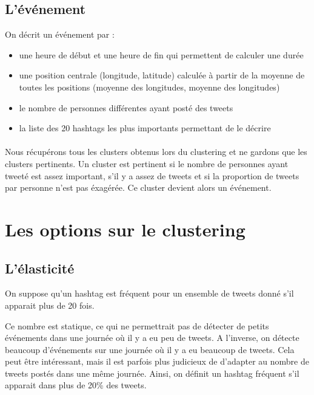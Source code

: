\documentclass[12pt]{article}
\begin{document}
\subsection{L'\'ev\'enement}
On d\'ecrit un \'ev\'enement par :
\begin{itemize}
\item une heure de d\'ebut et une heure de fin qui permettent de calculer une dur\'ee
\item une position centrale (longitude, latitude) calcul\'ee \`a partir de la moyenne de toutes
les positions (moyenne des longitudes, moyenne des longitudes)
\item le nombre de personnes diff\'erentes ayant post\'e des tweets
\item la liste des 20 hashtags les plus importants permettant de le d\'ecrire
\end{itemize}
\paragraph{}
Nous r\'ecup\'erons tous les clusters obtenus lors du clustering et ne gardons que les clusters pertinents. 
Un cluster est pertinent si le nombre de personnes ayant tweet\'e est assez important, s'il y a assez de tweets et 
si la proportion de tweets par personne n'est pas \'exag\'er\'ee. Ce cluster devient alors un \'ev\'enement.

\newpage

\section{Les options sur le clustering}

\subsection{L'\'elasticit\'e}

On suppose qu'un hashtag est fr\'equent pour un ensemble de tweets donn\'e s'il apparait
plus de 20 fois.

Ce nombre est statique, ce qui ne permettrait pas de d\'etecter de petits \'ev\'enements dans
une journ\'ee o\`u il y a eu peu de tweets. A l'inverse, on d\'etecte beaucoup d'\'ev\'enements sur
une journ\'ee o\`u il y a eu beaucoup de tweets.
Cela peut \^etre int\'eressant, mais il est parfois plus judicieux de d'adapter au nombre de
tweets post\'es dans une m\^eme journ\'ee. Ainsi, on d\'efinit un hashtag fr\'equent s'il apparait
dans plus de 20\% des tweets.
\end{document}
